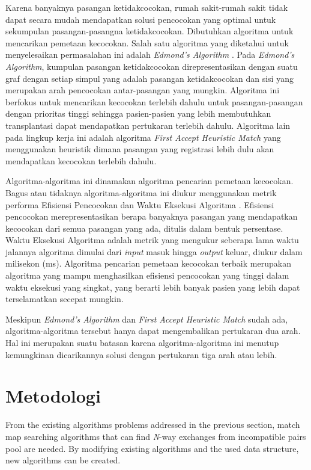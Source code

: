 \documentclass[conference]{IEEEtran}
\begin{document}
Karena banyaknya pasangan ketidakcocokan, rumah sakit-rumah sakit tidak dapat secara mudah mendapatkan solusi pencocokan
yang optimal untuk sekumpulan pasangan-pasangna ketidakcocokan. Dibutuhkan algoritma untuk mencarikan pemetaan kecocokan.
Salah satu algoritma yang diketahui untuk menyelesaikan permasalahan ini adalah \textit{Edmond's Algorithm} \cite{raja}.
Pada \textit{Edmond's Algorithm}, kumpulan pasangan ketidakcocokan direpresentasikan dengan suatu graf dengan setiap simpul
yang adalah pasangan ketidakcocokan dan sisi yang merupakan arah pencocokan antar-pasangan yang mungkin. Algoritma ini berfokus
untuk mencarikan kecocokan terlebih dahulu untuk pasangan-pasangan dengan prioritas tinggi sehingga pasien-pasien yang lebih
membutuhkan transplantasi dapat mendapatkan pertukaran terlebih dahulu. Algoritma lain pada lingkup kerja ini adalah algoritma
\textit{First Accept Heuristic Match} \cite{raja} yang menggunakan heuristik dimana pasangan yang registrasi lebih dulu akan
mendapatkan kecocokan terlebih dahulu.

Algoritma-algoritma ini dinamakan algoritma pencarian pemetaan kecocokan. Bagus atau tidaknya algoritma-algoritma ini diukur
menggunakan metrik performa Efisiensi Pencocokan dan Waktu Eksekusi Algoritma \cite{tullis}. Efisiensi pencocokan merepresentasikan
berapa banyaknya pasangan yang mendapatkan kecocokan dari semua pasangan yang ada, ditulis dalam bentuk persentase. Waktu Eksekusi
Algoritma adalah metrik yang mengukur seberapa lama waktu jalannya algoritma dimulai dari \textit{input} masuk hingga \textit{output}
keluar, diukur dalam milisekon (ms). Algoritma pencarian pemetaan kecocokan terbaik merupakan algoritma yang mampu menghasilkan
efisiensi pencocokan yang tinggi dalam waktu eksekusi yang singkat, yang berarti lebih banyak pasien yang lebih dapat terselamatkan
secepat mungkin.

Meskipun \textit{Edmond's Algorithm} dan \textit{First Accept Heuristic Match} sudah ada, algoritma-algoritma
tersebut hanya dapat mengembalikan pertukaran dua arah. Hal ini merupakan suatu batasan karena algoritma-algoritma
ini menutup kemungkinan dicarikannya solusi dengan pertukaran tiga arah atau lebih.

\section{Metodologi}
From the existing algorithms problems addressed in the previous section, match map searching algorithms that can find
\textit{N}-way exchanges from incompatible pairs pool are needed. By modifying existing algorithms and the used data
structure, new algorithms can be created.
\end{document}
